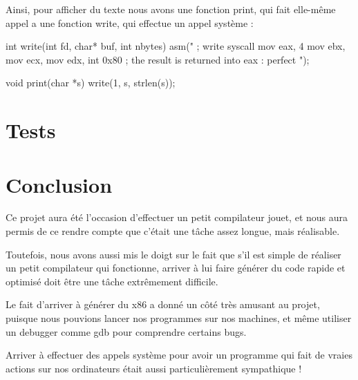 \documentclass{scrartcl}
\begin{document}
Ainsi, pour afficher du texte nous avons une fonction print, qui fait elle-même appel a une fonction
write, qui effectue un appel système :
\begin{moccode}
int write(int fd, char* buf, int nbytes) {
    asm("
        ; write syscall
        mov eax, 4
        mov ebx, %
        mov ecx, %
        mov edx, %
        int 0x80 ; the result is returned into eax : perfect
    ");
}

void print(char *s) {
    write(1, s, strlen(s));
}
\end{moccode}


\section{Tests}

\section{Conclusion}

Ce projet aura été l'occasion d'effectuer un petit compilateur jouet,
et nous aura permis de ce rendre compte que c'était une tâche assez longue,
mais réalisable.

Toutefois, nous avons aussi mis le doigt sur le fait que s'il est simple
de réaliser un petit compilateur qui fonctionne, arriver à lui faire
générer du code rapide et optimisé doit être une tâche extrêmement difficile.


Le fait d'arriver à générer du x86 a donné un côté très amusant au projet,
puisque nous pouvions lancer nos programmes sur nos machines, et même
utiliser un debugger comme gdb pour comprendre certains bugs.

Arriver à effectuer des appels système pour avoir un programme qui fait
de vraies actions sur nos ordinateurs était aussi particulièrement sympathique !
\end{document}
